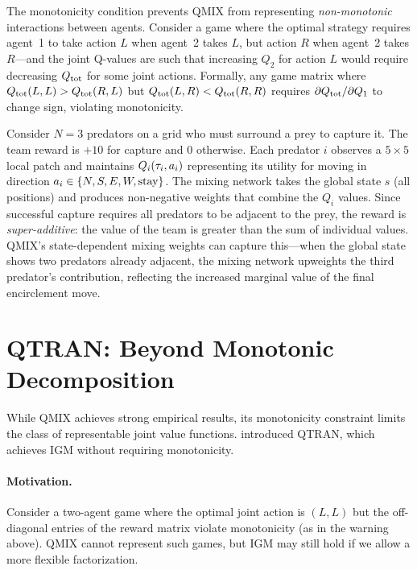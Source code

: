 \documentclass[11pt,a4paper]{article}
\begin{document}
\begin{warning}[title={Limitations of Monotonicity}]
The monotonicity condition prevents QMIX from representing
\emph{non-monotonic} interactions between agents.  Consider
a game where the optimal strategy requires agent~1 to take
action $L$ when agent~2 takes $L$, but action $R$ when
agent~2 takes $R$---and the joint Q-values are such that
increasing $Q_2$ for action $L$ would require decreasing
$Q_{\mathrm{tot}}$ for some joint actions.  Formally, any game matrix
where $Q_{\mathrm{tot}}(L, L) > Q_{\mathrm{tot}}(R, L)$ but $Q_{\mathrm{tot}}(L, R) <
Q_{\mathrm{tot}}(R, R)$ requires $\partial Q_{\mathrm{tot}} / \partial Q_1$ to
change sign, violating monotonicity.
\end{warning}

\begin{example}
\label{ex:qmix-predprey}
Consider $N = 3$ predators on a grid who must surround a prey
to capture it.  The team reward is $+10$ for capture and $0$
otherwise.  Each predator $i$ observes a $5 \times 5$ local
patch and maintains $Q_i(\tau_i, a_i)$ representing its
utility for moving in direction $a_i \in \{N, S, E, W,
\text{stay}\}$.  The mixing network takes the global state
$s$ (all positions) and produces non-negative weights that
combine the $Q_i$ values.  Since successful capture requires
all predators to be adjacent to the prey, the reward is
\emph{super-additive}: the value of the team is greater than
the sum of individual values.  QMIX's state-dependent mixing
weights can capture this---when the global state shows two
predators already adjacent, the mixing network upweights the
third predator's contribution, reflecting the increased
marginal value of the final encirclement move.
\end{example}

\section{QTRAN: Beyond Monotonic Decomposition}
\label{sec:qtran}

While QMIX achieves strong empirical results, its monotonicity
constraint limits the class of representable joint value functions.
\citet{son2019} introduced QTRAN, which achieves IGM without
requiring monotonicity.

\paragraph{Motivation.}
Consider a two-agent game where the optimal joint action is
$(L, L)$ but the off-diagonal entries of the reward matrix
violate monotonicity (as in the warning above).  QMIX cannot
represent such games, but IGM may still hold if we allow a
more flexible factorization.
\end{document}
